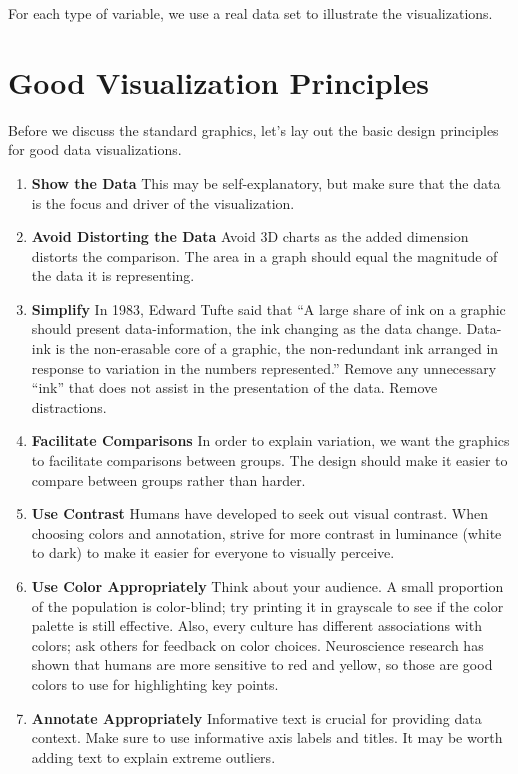 \documentclass[]{book}
\begin{document}
For each type of variable, we use a real data set to illustrate the visualizations.

\hypertarget{good-visualization-principles}{%
\section{Good Visualization Principles}\label{good-visualization-principles}}

Before we discuss the standard graphics, let's lay out the basic design principles for good data visualizations.

\begin{enumerate}
\def\labelenumi{\arabic{enumi}.}
\item
  \textbf{Show the Data} This may be self-explanatory, but make sure that the data is the focus and driver of the visualization.
\item
  \textbf{Avoid Distorting the Data} Avoid 3D charts as the added dimension distorts the comparison. The area in a graph should equal the magnitude of the data it is representing.
\item
  \textbf{Simplify} In 1983, Edward Tufte said that ``A large share of ink on a graphic should present data-information, the ink changing as the data change. Data-ink is the non-erasable core of a graphic, the non-redundant ink arranged in response to variation in the numbers represented.'' Remove any unnecessary ``ink'' that does not assist in the presentation of the data. Remove distractions.
\item
  \textbf{Facilitate Comparisons} In order to explain variation, we want the graphics to facilitate comparisons between groups. The design should make it easier to compare between groups rather than harder.
\item
  \textbf{Use Contrast} Humans have developed to seek out visual contrast. When choosing colors and annotation, strive for more contrast in luminance (white to dark) to make it easier for everyone to visually perceive.
\item
  \textbf{Use Color Appropriately} Think about your audience. A small proportion of the population is color-blind; try printing it in grayscale to see if the color palette is still effective. Also, every culture has different associations with colors; ask others for feedback on color choices. Neuroscience research has shown that humans are more sensitive to red and yellow, so those are good colors to use for highlighting key points.
\item
  \textbf{Annotate Appropriately} Informative text is crucial for providing data context. Make sure to use informative axis labels and titles. It may be worth adding text to explain extreme outliers.
\end{enumerate}
\end{document}
